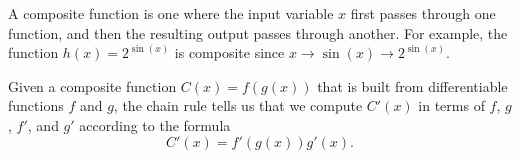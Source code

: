 \begin{summary}
\item A composite function is one where the input variable $x$ first passes through one function, and then the resulting output passes through another.  For example, the function $h(x) = 2^{\sin(x)}$ is composite since $x \longrightarrow \sin(x) \longrightarrow 2^{\sin(x)}.$
\item Given a composite function $C(x) = f(g(x))$ that is built from differentiable functions $f$ and $g$, the chain rule tells us that we compute $C'(x)$ in terms of $f$, $g$, $f'$, and $g'$ according to the formula
$$C'(x) = f'(g(x)) g'(x).$$  
\end{summary}

\nin \hrulefill

 

\clearpage